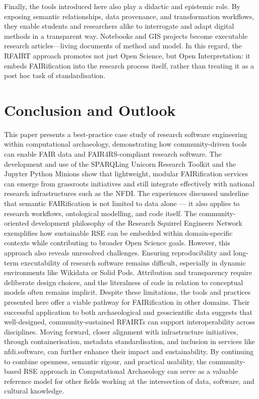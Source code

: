 \documentclass{eceasst}
\begin{document}
Finally, the tools introduced here also play a didactic and epistemic role. By exposing semantic relationships, data provenance, and transformation workflows, they enable students and researchers alike to interrogate and adapt digital methods in a transparent way. Notebooks and GIS projects become executable research articles—living documents of method and model. In this regard, the RFAIRT approach promotes not just Open Science, but Open Interpretation: it embeds FAIRification into the research process itself, rather than treating it as a post hoc task of standardisation.

\section{Conclusion and Outlook}
\label{sec:conclusion}

This paper presents a best-practice case study of research software engineering within computational archaeology, demonstrating how community-driven tools can enable FAIR data and FAIR4RS-compliant research software. The development and use of the SPARQLing Unicorn Research Toolkit and the Jupyter Python Minions show that lightweight, modular FAIRification services can emerge from grassroots initiatives and still integrate effectively with national research infrastructures such as the NFDI. The experiences discussed underline that semantic FAIRification is not limited to data alone — it also applies to research workflows, ontological modelling, and code itself. The community-oriented development philosophy of the Research Squirrel Engineers Network exemplifies how sustainable RSE can be embedded within domain-specific contexts while contributing to broader Open Science goals. However, this approach also reveals unresolved challenges. Ensuring reproducibility and long-term executability of research software remains difficult, especially in dynamic environments like Wikidata or Solid Pods. Attribution and transparency require deliberate design choices, and the literalness of code in relation to conceptual models often remains implicit. Despite these limitations, the tools and practices presented here offer a viable pathway for FAIRification in other domains. Their successful application to both archaeological and geoscientific data suggests that well-designed, community-sustained RFAIRTs can support interoperability across disciplines. Moving forward, closer alignment with infrastructure initiatives, through containerisation, metadata standardisation, and inclusion in services like nfdi.software, can further enhance their impact and sustainability. By continuing to combine openness, semantic rigour, and practical usability, the community-based RSE approach in Computational Archaeology can serve as a valuable reference model for other fields working at the intersection of data, software, and cultural knowledge.
\end{document}
